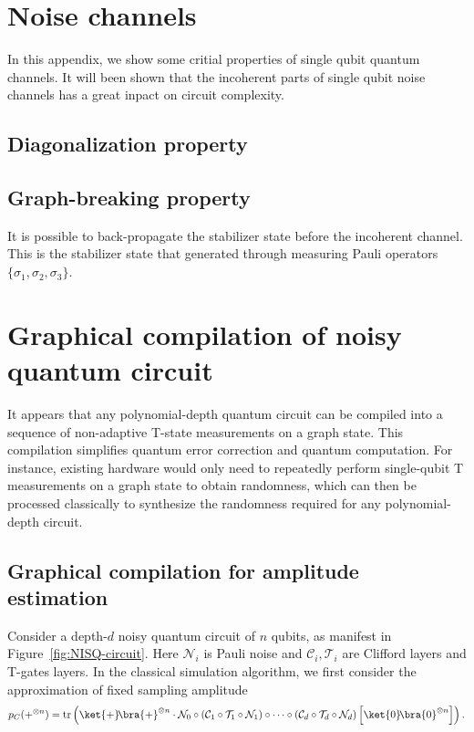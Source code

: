 \documentclass[aps,%
twocolumn,%
floatfix,%
pra,%
amsfonts,%
longbibliography,%
groupedaddress,%
superscriptaddress]{revtex4-2}%
\newcommand{\1}{\mathbbm{1}}
\begin{document}
\section{Noise channels}
In this appendix, we show some critial properties of single qubit quantum channels. It will been shown that the incoherent parts of single qubit noise channels has a great inpact on circuit complexity.
\subsection{Diagonalization property}


\subsection{Graph-breaking property}
It is possible to back-propagate the stabilizer state before the incoherent channel. This is the stabilizer state that generated through measuring Pauli operators $\{\sigma_1,\sigma_2,\sigma_3\}$. 

\section{Graphical compilation of noisy quantum circuit}
It appears that any polynomial-depth quantum circuit can be compiled into a sequence of non-adaptive T-state measurements on a graph state. This compilation simplifies quantum error correction and quantum computation. For instance, existing hardware would only need to repeatedly perform single-qubit T measurements on a graph state to obtain randomness, which can then be processed classically to synthesize the randomness required for any polynomial-depth circuit.

\subsection{Graphical compilation for amplitude estimation}
Consider a depth-$d$ noisy quantum circuit of $n$ qubits, as manifest in Figure~\ref{fig:NISQ-circuit}. Here $\mathcal{N}_i$ is Pauli noise and $\mathcal{C}_i, \mathcal{T}_i$ are Clifford layers and T-gates layers.  In the classical simulation algorithm, we first consider the approximation of fixed sampling amplitude
\begin{align}
    p_C(+^{\otimes n}) = \text{tr}\left(\ket{+}\!\bra{+}^{\otimes n} \cdot\mathcal{N}_0  \circ (\mathcal{C}_1\circ \mathcal{T}_1 \circ\mathcal{N}_1)\circ \cdots\circ(\mathcal{C}_d\circ \mathcal{T}_d \circ \mathcal{N}_d)\left[\ket{0}\!\bra{0}^{\otimes n} \right]\right).
\end{align}
\end{document}
